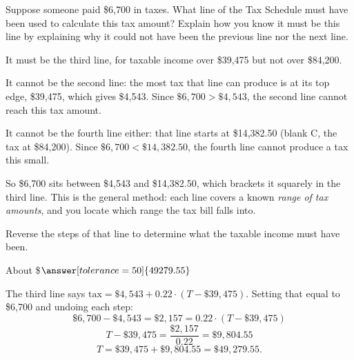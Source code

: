 \documentclass[12pt]{ximera}
\begin{document}
\begin{problem}
Suppose someone paid \$6,700 in taxes. What line of the Tax Schedule must have been used
to calculate this tax amount? Explain how you know it must be this line by explaining
why it could not have been the previous line nor the next line.

\begin{freeResponse}
\end{freeResponse}

\begin{solution}
It must be the third line, for taxable income over \$39,475 but not over \$84,200.

It cannot be the second line: the most tax that line can produce is at its top edge,
\$39,475, which gives \$4,543. Since $\$6{,}700 > \$4{,}543$, the second line cannot
reach this tax amount.

It cannot be the fourth line either: that line starts at \$14,382.50 (blank C, the tax
at \$84,200). Since $\$6{,}700 < \$14{,}382.50$, the fourth line cannot produce a tax
this small.

So \$6,700 sits between \$4,543 and \$14,382.50, which brackets it squarely in the third
line. This is the general method: each line covers a known \emph{range of tax amounts},
and you locate which range the tax bill falls into.
\end{solution}
\end{problem}

\begin{problem}
Reverse the steps of that line to determine what the taxable income must have been.

About \$$\answer[tolerance=50]{49279.55}$

\begin{solution}
The third line says $\text{tax} = \$4{,}543 + 0.22 \cdot (T - \$39{,}475)$. Setting that
equal to \$6,700 and undoing each step:
\[
\$6{,}700 - \$4{,}543 = \$2{,}157 = 0.22 \cdot (T - \$39{,}475)
\]
\[
T - \$39{,}475 = \frac{\$2{,}157}{0.22} = \$9{,}804.55
\]
\[
T = \$39{,}475 + \$9{,}804.55 = \$49{,}279.55.
\]
\end{solution}
\end{problem}
\end{document}
